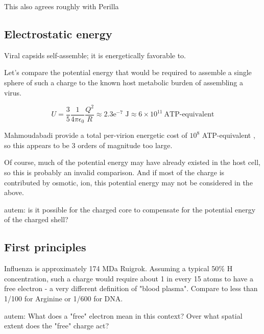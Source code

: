 \documentclass[paper.tex]{subfiles}
\begin{document}
This also agrees roughly with Perilla \cite{Physical2017}


\subsection{Electrostatic energy}

Viral capsids self-assemble; it is energetically favorable to. 

Let's compare the potential energy that would be required to assemble a single sphere of such a charge to the known host metabolic burden of assembling a virus.


$$ U = \frac{3}{5}  \frac{1}{4 \pi \epsilon_0} \frac{Q^2}{R} \approx 2.3\text{e}^{-7} \text{ J} \approx 6 \times 10^{11}\  \text{ATP-equivalent} $$



Mahmoudabadi\cite{Energetic2017} provide a total per-virion energetic cost of $10^8 $ ATP-equivalent , so this appears to be 3 orders of magnitude too large.

Of course, much of the potential energy may have already existed in the host cell, so this is probably an invalid comparison. And if most of the charge is contributed by osmotic, ion, this potential energy may not be considered in the above. 

\begin{autem}
	autem: is it possible for the charged core to compensate for the potential energy of the charged shell?
\end{autem}

\subsection{First principles}

Influenza is approximately 174 MDa Ruigrok. Assuming a typical 50\% H concentration, such a charge would require about 1 in every 15 atoms to have a free electron - a very different definition of "blood plasma". Compare to less than 1/100 for Arginine or 1/600 for DNA. 

\begin{autem}
	autem: What does a "free" electron mean in this context? Over what spatial extent does the "free" charge act?
\end{autem}
\end{document}
